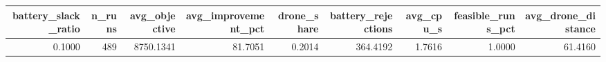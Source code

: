 \begin{tabular}{rrrrrrrrr}
\toprule
battery_slack_ratio & n_runs & avg_objective & avg_improvement_pct & drone_share & battery_rejections & avg_cpu_s & feasible_runs_pct & avg_drone_distance \\
\midrule
0.1000 & 489 & 8750.1341 & 81.7051 & 0.2014 & 364.4192 & 1.7616 & 1.0000 & 61.4160 \\
\bottomrule
\end{tabular}
